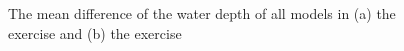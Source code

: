 \documentclass{isprs}
\begin{document}
\begin{figure}
\begin{center}
\caption{The mean difference of the water depth of all models in (a) the  exercise and (b) the  exercise}
\label{fig:mean_diff}
\end{center}
\end{figure}

 
\end{document}
